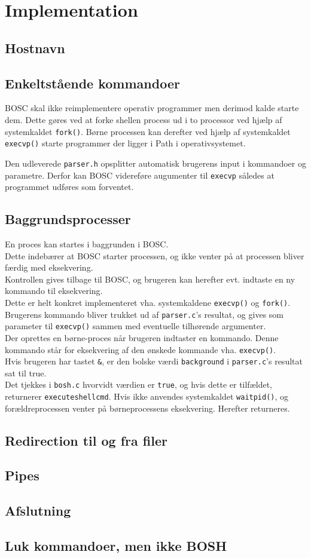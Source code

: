 \section{Implementation}
\subsection{Hostnavn}
\subsection{Enkeltstående kommandoer}
BOSC skal ikke reimplementere operativ programmer men derimod kalde starte dem. Dette gøres ved at forke shellen process ud i to processor ved hjælp af systemkaldet \verb+fork()+. Børne processen kan derefter ved hjælp af systemkaldet \verb+execvp()+ starte programmer der ligger i Path i operativsystemet. 

Den udleverede \verb+parser.h+ opsplitter automatisk brugerens input i kommandoer og parametre. Derfor kan BOSC videreføre augumenter til \verb+execvp+ således at programmet udføres som forventet.
\subsection{Baggrundsprocesser}
En proces kan startes i baggrunden i BOSC. \\ 
Dette indebærer at BOSC starter processen, og ikke venter på at processen bliver færdig med eksekvering. \\
Kontrollen gives tilbage til BOSC, og brugeren kan herefter evt. indtaste en ny kommando til eksekvering. \\
Dette er helt konkret implementeret vha. systemkaldene \verb+execvp()+ og \verb+fork()+. Brugerens kommando bliver trukket ud af \verb+parser.c+'s resultat, og gives som parameter til \verb+execvp()+ sammen med eventuelle tilhørende argumenter. \\
Der oprettes en børne-proces når brugeren indtaster en kommando. Denne kommando står for eksekvering af den ønskede kommande vha. \verb+execvp()+. \\
Hvis brugeren har tastet \verb+&+, er den bolske værdi \verb+background+ i \verb+parser.c+'s resultat sat til true. \\
Det tjekkes i \verb+bosh.c+ hvorvidt værdien er \verb+true+, og hvis dette er tilfældet, returnerer \verb+executeshellcmd+. Hvis ikke anvendes systemkaldet \verb+waitpid()+, og forældreprocessen venter på børneprocessens eksekvering. Herefter returneres.
\subsection{Redirection til og fra filer}
\subsection{Pipes}
\subsection{Afslutning}
\subsection{Luk kommandoer, men ikke BOSH}